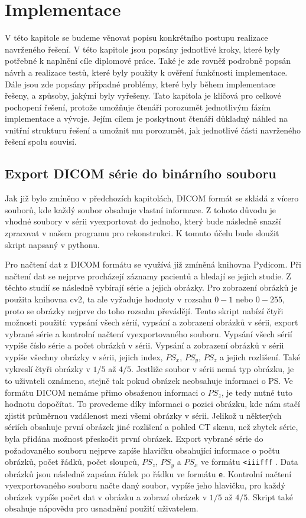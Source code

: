 \chapter{Implementace}
V této kapitole se budeme věnovat popisu konkrétního postupu realizace navrženého řešení. V této kapitole jsou popsány jednotlivé kroky, které byly potřebné k naplnění cíle diplomové práce. Také je zde rovněž podrobně popsán návrh a realizace testů, které byly použity k ověření funkčnosti implementace. Dále jsou zde popsány případné problémy, které byly během implementace řešeny, a způsoby, jakými byly vyřešeny. Tato kapitola je klíčová pro celkové pochopení řešení, protože umožňuje čtenáři porozumět jednotlivým fázím implementace a vývoje. Jejím cílem je poskytnout čtenáři důkladný náhled na vnitřní strukturu řešení a umožnit mu porozumět, jak jednotlivé části navrženého řešení spolu souvisí.

\section{Export DICOM série do binárního souboru}
Jak již bylo zmíněno v předchozích kapitolách, DICOM formát se skládá z vícero souborů, kde každý soubor obsahuje vlastní informace. Z tohoto důvodu je vhodné soubory v sérii vyexportovat do jednoho, který bude následně snazší zpracovat v našem programu pro rekonstrukci. K tomuto účelu bude sloužit skript napsaný v pythonu.

Pro načtení dat z DICOM formátu se využívá již zmíněná knihovna Pydicom. Při načtení dat se nejprve procházejí záznamy pacientů a hledají se jejich studie. Z těchto studií se následně vybírají série a jejich obrázky. Pro zobrazení obrázků je použita knihovna cv2, ta ale vyžaduje hodnoty v rozsahu $0-1$ nebo $0-255$, proto se obrázky nejprve do toho rozsahu převádějí. Tento skript nabízí čtyři možnosti použití: vypsání všech sérií, vypsání a zobrazení obrázků v sérii, export vybrané série a kontrolní načtení vyexportovaného souboru. Vypsání všech sérií vypíše číslo série a počet obrázků v sérii. Vypsání a zobrazení obrázků v sérii vypíše všechny obrázky v sérii, jejich index, $PS_x$, $PS_y$, $PS_z$ a jejich rozlišení. Také vykreslí čtyři obrázky v $1/5$ až $4/5$. Jestliže soubor v sérii nemá typ obrázku, je to uživateli oznámeno, stejně tak pokud obrázek neobsahuje informaci o PS. Ve formátu DICOM nemáme přimo obsaženou informaci o $PS_z$, je tedy nutné tuto hodnotu dopočítat. To provedeme díky informaci o pozici obrázku, kde nám stačí zjistit průměrnou vzdálenost mezi všemi obrázky v sérii. Jelikož u některých sériích obsahuje první obrázek jiné rozlišení a pohled CT skenu, než zbytek série, byla přidána možnost přeskočit první obrázek. Export vybrané série do požadovaného souboru nejprve zapíše hlavičku obsahující informace o počtu obrázků, počet řádků, počet sloupců, $PS_z$, $PS_y$ a $PS_x$ ve formátu \verb|<iiifff| \cite{python-byte-order-size-alignment}. Data obrázků jsou následně zapsána řádek po řádku ve formátu \verb|e|. Kontrolní načtení vyexportovaného souboru načte daný soubor, vypíše jeho hlavičku, pro každý obrázek vypíše počet dat v obrázku a zobrazí obrázek v $1/5$ až $4/5$. Skript také obsahuje nápovědu pro usnadnění použití uživatelem.

